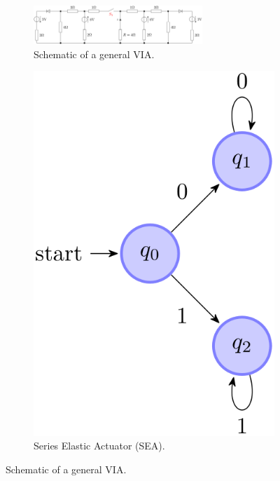 \documentclass[12pt,a4paper]{article}
\begin{document}
        \begin{figure}
            \centering
                \begin{subfigure}{0.45\textwidth}
                    \includegraphics[width=0.7\textwidth]{figures/fig5.png}
                    \caption{Schematic of a general VIA.}
                    \label{fig:a_general_VIA}
                \end{subfigure}
                \hfill
                \begin{subfigure}{0.45\textwidth}
                    \includegraphics[width=\textwidth]{figures/fig4.png}
                    \caption{Series Elastic Actuator (SEA).}\label{fig:b_general_VIA}
                \end{subfigure}
            \caption{Schematic of a general VIA.}\label{fig:general_VIA}
        \end{figure}
    
\end{document}
